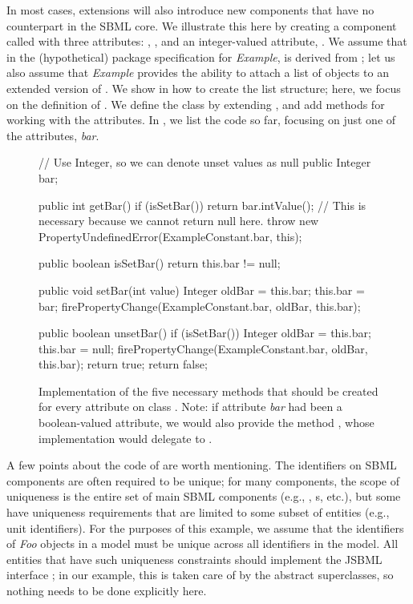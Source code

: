 In most cases, extensions will also introduce new components that have no
counterpart in the SBML core.  We illustrate this here by creating a
component called  with three attributes: , ,
and an integer-valued attribute, .  We assume that in the
(hypothetical) package specification for \emph{Example},  is
derived from \SBase; let us also assume that \emph{Example} provides the
ability to attach a list of  objects to an extended version of
\Model.  We show in  how to create the list
structure; here, we focus on the definition of .  We define the
class  by extending \AbstractSBasePlugin, and add methods for
working with the attributes.  In ,
we list the code so far, focusing on just one of the attributes,
\emph{bar}.

\begin{figure}[hbt]
  \begin{example}
// Use Integer, so we can denote unset values as null public Integer bar;

public int getBar() {
  if (isSetBar()) {
    return bar.intValue();
  }
  // This is necessary because we cannot return null here.
  throw new PropertyUndefinedError(ExampleConstant.bar, this);
}

public boolean isSetBar() {
  return this.bar != null;
}

public void setBar(int value) {
  Integer oldBar = this.bar;
  this.bar = bar;
  firePropertyChange(ExampleConstant.bar, oldBar, this.bar);
}

public boolean unsetBar() {
  if (isSetBar()) {
    Integer oldBar = this.bar;
    this.bar = null;
    firePropertyChange(ExampleConstant.bar, oldBar, this.bar);
    return true;
  }
  return false;
}\end{example}
  \caption{Implementation of the five necessary methods that should be
    created for every attribute on class .  Note: if attribute
    \emph{bar} had been a boolean-valued attribute, we would also provide
    the method , whose implementation would delegate to
    .}
  \label{lst:DefaultModelExtFooBar}
\end{figure}

A few points about the code of  are worth
mentioning.  The identifiers on SBML components are often required to be
unique; for many components, the scope of uniqueness is the entire set of
main SBML components (e.g., \Species, \Compartment{}s, etc.), but some have
uniqueness requirements that are limited to some subset of entities (e.g.,
unit identifiers).  For the purposes of this example, we assume that the
identifiers of \emph{Foo} objects in a model must be unique across all
identifiers in the model.  All entities that have such uniqueness constraints
should implement the JSBML interface \UniqueNamedSBase; in our example, this
is taken care of by the abstract superclasses, so nothing needs to be done
explicitly here.


